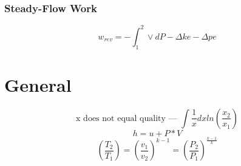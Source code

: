 \documentclass[10pt,landscape]{article}
\begin{document}
\begin{multicols}{3}
\subsubsection{Steady-Flow Work}
\begin{equation}
    w_{rev}=-\int^2_1\vee dP-\Delta ke - \Delta pe
\end{equation}
\section{General}
\begin{equation}
    \text{x does not equal quality --- }\int\frac{1}{x}dxln(\frac{x_2}{x_1})
\end{equation}
\begin{equation}
    h=u+P*V
\end{equation}
\begin{equation}
    (\frac{T_2}{T_1})=(\frac{v_1}{v_2})^{k-1}=(\frac{P_2}{P_1})^{\frac{k-1}{k}}
\end{equation}

\end{multicols}
\end{document}
